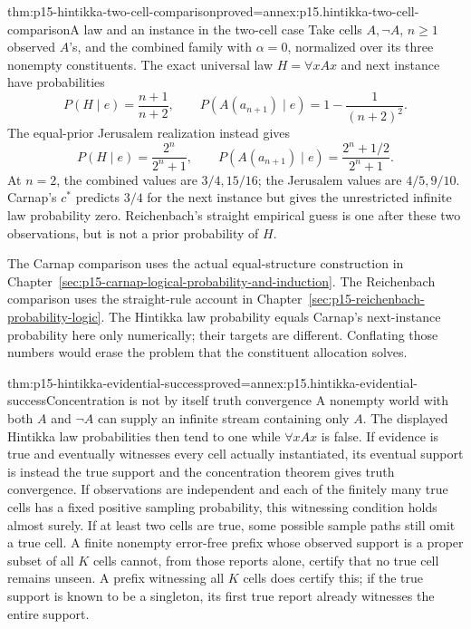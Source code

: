 \begin{hbtheorem}{thm:p15-hintikka-two-cell-comparison}{proved=annex:p15.hintikka-two-cell-comparison}{A law and an instance in the two-cell case}
Take cells \(A,\neg A\), \(n\geq1\) observed \(A\)'s, and
the combined family with \(\alpha=0\), normalized over its three
nonempty constituents. The exact universal law \(H=\forall xAx\)
and next instance have probabilities
\[
 P(H\mid e)=\frac{n+1}{n+2},\qquad
 P(A(a_{n+1})\mid e)=1-\frac1{(n+2)^2}.
\]
The equal-prior Jerusalem realization instead gives
\[
 P(H\mid e)=\frac{2^n}{2^n+1},\qquad
 P(A(a_{n+1})\mid e)=\frac{2^n+1/2}{2^n+1}.
\]
At \(n=2\), the combined values are \(3/4,15/16\); the
Jerusalem values are \(4/5,9/10\). Carnap's \(c^*\) predicts
\(3/4\) for the next instance but gives the unrestricted infinite
law probability zero. Reichenbach's straight empirical guess is one
after these two observations, but is not a prior probability of \(H\).
\end{hbtheorem}

The Carnap comparison uses the actual equal-structure construction in
Chapter~\ref{sec:p15-carnap-logical-probability-and-induction}.
The Reichenbach comparison uses the straight-rule account in
Chapter~\ref{sec:p15-reichenbach-probability-logic}.
The Hintikka law probability equals Carnap's next-instance probability
here only numerically; their targets are different. Conflating those
numbers would erase the problem that the constituent allocation solves.

\begin{hbtheorem}{thm:p15-hintikka-evidential-success}{proved=annex:p15.hintikka-evidential-success}{Concentration is not by itself truth convergence}
A nonempty world with both \(A\) and \(\neg A\) can supply an
infinite stream containing only \(A\). The displayed Hintikka law
probabilities then tend to one while \(\forall xAx\) is false.
If evidence is true and eventually witnesses every cell actually
instantiated, its eventual support is instead the true support and
the concentration theorem gives truth convergence.
If observations are independent and each of the finitely many true
cells has a fixed positive sampling probability, this witnessing
condition holds almost surely. If at least two cells are true, some
possible sample paths still omit a true cell. A finite nonempty
error-free prefix whose observed support is a proper subset of all
\(K\) cells cannot, from those reports alone, certify that no true cell
remains unseen. A prefix witnessing all \(K\) cells does certify this;
if the true support is known to be a singleton, its first true report
already witnesses the entire support.
\end{hbtheorem}

